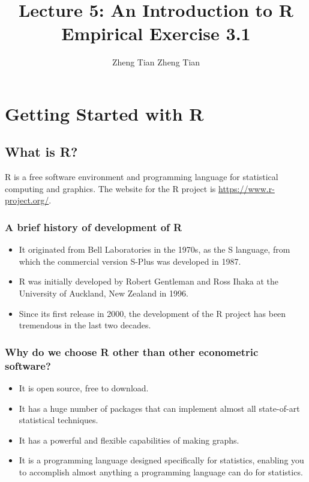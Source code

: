 \documentclass[a4paper,11pt]{article}
\author{Zheng Tian Zheng Tian}
\date{}
\title{Lecture 5: An Introduction to R Empirical Exercise 3.1}
\begin{document}
\maketitle
\setcounter{tocdepth}{1}
\tableofcontents



\section{Getting Started with R}
\label{sec:orgae11015}

\subsection{What is R?}
\label{sec:org924c20f}

R is a free software environment and programming language for
statistical computing and graphics. The website for the R project is
\url{https://www.r-project.org/}.

\subsubsection*{A brief history of development of R}
\label{sec:org0a74503}

\begin{itemize}
\item It originated from Bell Laboratories in the 1970s, as the S
language, from which the commercial version S-Plus was developed
in 1987.

\item R was initially developed by Robert Gentleman and Ross Ihaka at the
University of Auckland, New Zealand in 1996.

\item Since its first release in 2000, the development of the R project
has been tremendous in the last two decades.
\end{itemize}

\subsubsection*{Why do we choose R other than other econometric software?}
\label{sec:org8f8985c}

\begin{itemize}
\item It is open source, free to download.
\item It has a huge number of packages that can implement almost all
state-of-art statistical techniques.
\item It has a powerful and flexible capabilities of making graphs.
\item It is a programming language designed specifically for
statistics, enabling you to accomplish almost anything a programming
language can do for statistics.
\end{itemize}
\end{document}
